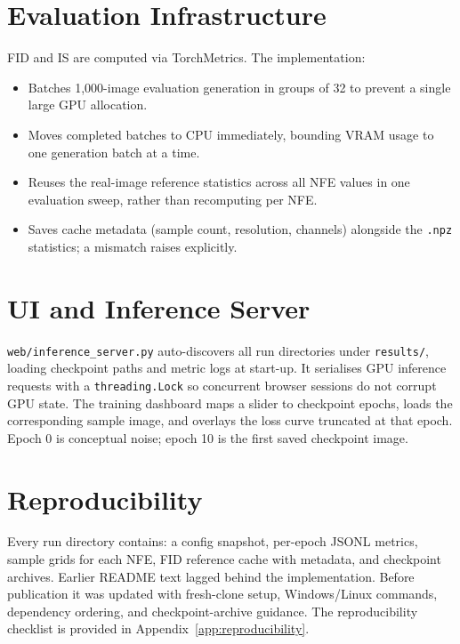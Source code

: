 \section{Evaluation Infrastructure}

FID and IS are computed via TorchMetrics. The implementation:
\begin{itemize}
  \item Batches 1{,}000-image evaluation generation in groups of 32 to prevent a single
        large GPU allocation.
  \item Moves completed batches to CPU immediately, bounding VRAM usage to one
        generation batch at a time.
  \item Reuses the real-image reference statistics across all NFE values in one
        evaluation sweep, rather than recomputing per NFE.
  \item Saves cache metadata (sample count, resolution, channels) alongside the
        \texttt{.npz} statistics; a mismatch raises explicitly.
\end{itemize}

\section{UI and Inference Server}\label{sec:ui}

\texttt{web/inference\_server.py} auto-discovers all run directories under
\texttt{results/}, loading checkpoint paths and metric logs at start-up. It
serialises GPU inference requests with a \texttt{threading.Lock} so concurrent
browser sessions do not corrupt GPU state. The training dashboard maps a slider
to checkpoint epochs, loads the corresponding sample image, and overlays the
loss curve truncated at that epoch. Epoch 0 is conceptual noise; epoch 10 is the
first saved checkpoint image.

\section{Reproducibility}\label{sec:reproducibility}

Every run directory contains: a config snapshot, per-epoch JSONL metrics, sample
grids for each NFE, FID reference cache with metadata, and checkpoint archives.
Earlier README text lagged behind the implementation. Before publication it was
updated with fresh-clone setup, Windows/Linux commands, dependency ordering, and
checkpoint-archive guidance. The reproducibility checklist is provided in
Appendix~\ref{app:reproducibility}.
